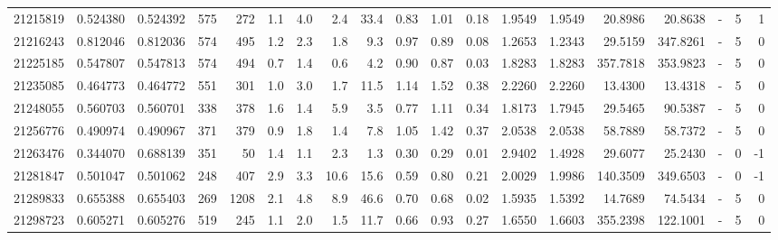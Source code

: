 \begin{tabular}{rrrrrrrrrrrrrrrrlrr}
  21215819 & 0.524380 &   0.524392 &  575 &  272 &      1.1 &      4.0 &     2.4 &     33.4 &       0.83 &        1.01 &        0.18 &  1.9549 &  1.9549 &   20.8986 &   20.8638 &             - &        5 &          1 \\
  21216243 & 0.812046 &   0.812036 &  574 &  495 &      1.2 &      2.3 &     1.8 &      9.3 &       0.97 &        0.89 &        0.08 &  1.2653 &  1.2343 &   29.5159 &  347.8261 &             - &        5 &          0 \\
  21225185 & 0.547807 &   0.547813 &  574 &  494 &      0.7 &      1.4 &     0.6 &      4.2 &       0.90 &        0.87 &        0.03 &  1.8283 &  1.8283 &  357.7818 &  353.9823 &             - &        5 &          0 \\
  21235085 & 0.464773 &   0.464772 &  551 &  301 &      1.0 &      3.0 &     1.7 &     11.5 &       1.14 &        1.52 &        0.38 &  2.2260 &  2.2260 &   13.4300 &   13.4318 &             - &        5 &          0 \\
  21248055 & 0.560703 &   0.560701 &  338 &  378 &      1.6 &      1.4 &     5.9 &      3.5 &       0.77 &        1.11 &        0.34 &  1.8173 &  1.7945 &   29.5465 &   90.5387 &             - &        5 &          0 \\
  21256776 & 0.490974 &   0.490967 &  371 &  379 &      0.9 &      1.8 &     1.4 &      7.8 &       1.05 &        1.42 &        0.37 &  2.0538 &  2.0538 &   58.7889 &   58.7372 &             - &        5 &          0 \\
  21263476 & 0.344070 &   0.688139 &  351 &   50 &      1.4 &      1.1 &     2.3 &      1.3 &       0.30 &        0.29 &        0.01 &  2.9402 &  1.4928 &   29.6077 &   25.2430 &             - &        0 &         -1 \\
  21281847 & 0.501047 &   0.501062 &  248 &  407 &      2.9 &      3.3 &    10.6 &     15.6 &       0.59 &        0.80 &        0.21 &  2.0029 &  1.9986 &  140.3509 &  349.6503 &             - &        0 &         -1 \\
  21289833 & 0.655388 &   0.655403 &  269 & 1208 &      2.1 &      4.8 &     8.9 &     46.6 &       0.70 &        0.68 &        0.02 &  1.5935 &  1.5392 &   14.7689 &   74.5434 &             - &        5 &          0 \\
  21298723 & 0.605271 &   0.605276 &  519 &  245 &      1.1 &      2.0 &     1.5 &     11.7 &       0.66 &        0.93 &        0.27 &  1.6550 &  1.6603 &  355.2398 &  122.1001 &             - &        5 &          0 \\

\end{tabular}
